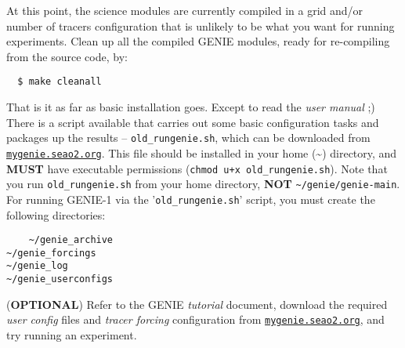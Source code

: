 \documentclass[10pt,twoside]{article}
\begin{document}
\begin{compactenum}
	\item	At this point, the science modules are currently compiled in a grid and/or number of tracers configuration that is unlikely to be what you want for running experiments. Clean up all the compiled GENIE modules, ready for re-compiling from the source code, by:
  \vspace{-5.5pt}\begin{verbatim}
  $ make cleanall
  \end{verbatim}\vspace{-11pt}

	\item	That is it as far as basic installation goes. Except to read the \textit{user manual} ;)
	There is a script available that carries out some basic configuration tasks and packages up the results -- \texttt{old\_rungenie.sh}, which can be downloaded from \href{http://mygenie.seao2.org}{\texttt{mygenie.seao2.org}}. This file should be installed in your home (\~{}) directory, and \textbf{MUST} have executable permissions (\texttt{chmod u+x old\_rungenie.sh}).
	Note that you run \texttt{old\_rungenie.sh} from your home directory, \textbf{NOT} \texttt{\~{}/genie/genie-main}.
	For running GENIE-1 via the '\texttt{old\_rungenie.sh}' script, you must create the following directories:
  \vspace{-5.5pt}\begin{verbatim}
	~/genie_archive
~/genie_forcings
~/genie_log
~/genie_userconfigs
  \end{verbatim}\vspace{-11pt}

	\item	(\textbf{OPTIONAL}) Refer to the GENIE \textit{tutorial} document, download the required \textit{user config} files and \textit{tracer forcing} configuration from \href{http://mygenie.seao2.org}{\texttt{mygenie.seao2.org}}, and try running an experiment.

\end{compactenum}


\end{document}
